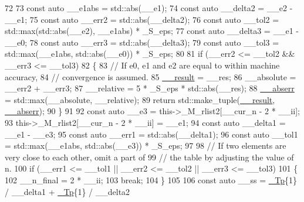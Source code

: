 \begin{DoxyCode}
72 
73           \textcolor{keyword}{const} \textcolor{keyword}{auto} \_\_e1abs = std::abs(\_\_e1);
74           \textcolor{keyword}{const} \textcolor{keyword}{auto} \_\_delta2 = \_\_e2 - \_\_e1;
75           \textcolor{keyword}{const} \textcolor{keyword}{auto} \_\_err2 = std::abs(\_\_delta2);
76           \textcolor{keyword}{const} \textcolor{keyword}{auto} \_\_tol2 = std::max(std::abs(\_\_e2), \_\_e1abs) * \_S\_eps;
77           \textcolor{keyword}{const} \textcolor{keyword}{auto} \_\_delta3 = \_\_e1 - \_\_e0;
78           \textcolor{keyword}{const} \textcolor{keyword}{auto} \_\_err3 = std::abs(\_\_delta3);
79           \textcolor{keyword}{const} \textcolor{keyword}{auto} \_\_tol3 = std::max(\_\_e1abs, std::abs(\_\_e0)) * \_S\_eps;
80 
81           \textcolor{keywordflow}{if} (\_\_err2 <= \_\_tol2 && \_\_err3 <= \_\_tol3)
82             \{
83               \textcolor{comment}{// If e0, e1 and e2 are equal to within machine accuracy,}
84               \textcolor{comment}{// convergence is assumed.}
85               \hyperlink{namespace____gnu__cxx_a500ea9f53aeaecd8c2ae657503450578}{\_\_result} = \_\_res;
86               \_\_absolute = \_\_err2 + \_\_err3;
87               \_\_relative = 5 * \_S\_eps * std::abs(\_\_res);
88               \hyperlink{namespace____gnu__cxx_a72f736cff127f1574e91a301de9e074b}{\_\_abserr} = std::max(\_\_absolute, \_\_relative);
89               \textcolor{keywordflow}{return} std::make\_tuple(\hyperlink{namespace____gnu__cxx_a500ea9f53aeaecd8c2ae657503450578}{\_\_result}, \hyperlink{namespace____gnu__cxx_a72f736cff127f1574e91a301de9e074b}{\_\_abserr});
90             \}
91 
92           \textcolor{keyword}{const} \textcolor{keyword}{auto} \_\_e3 = this->\_M\_rlist2[\_\_cur\_n - 2 * \_\_ii];
93           this->\_M\_rlist2[\_\_cur\_n - 2 * \_\_ii] = \_\_e1;
94           \textcolor{keyword}{const} \textcolor{keyword}{auto} \_\_delta1 = \_\_e1 - \_\_e3;
95           \textcolor{keyword}{const} \textcolor{keyword}{auto} \_\_err1 = std::abs(\_\_delta1);
96           \textcolor{keyword}{const} \textcolor{keyword}{auto} \_\_tol1 = std::max(\_\_e1abs, std::abs(\_\_e3)) * \_S\_eps;
97 
98           \textcolor{comment}{// If two elements are very close to each other, omit a part of}
99           \textcolor{comment}{// the table by adjusting the value of n.}
100           \textcolor{keywordflow}{if} (\_\_err1 <= \_\_tol1 || \_\_err2 <= \_\_tol2 || \_\_err3 <= \_\_tol3)
101             \{
102               \_\_n\_final = 2 * \_\_ii;
103               \textcolor{keywordflow}{break};
104             \}
105 
106           \textcolor{keyword}{const} \textcolor{keyword}{auto} \_\_ss = \hyperlink{namespace____gnu__cxx_a3b19a9c800ca194374ef9172290f7d79}{\_Tp}\{1\} / \_\_delta1 + \hyperlink{namespace____gnu__cxx_a3b19a9c800ca194374ef9172290f7d79}{\_Tp}\{1\} / \_\_delta2

\end{DoxyCode}
